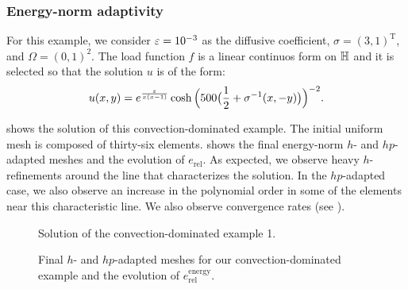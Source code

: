 \subsubsection{Energy-norm adaptivity}

For this example, we consider $\varepsilon= 10^{-3}$ as the diffusive coefficient, $\sigma=(3,1)^{\text{T}}$, and $\Omega=(0,1)^{2}$. The load function $f$ is a linear continuos form on $\mathbb{H}$ and it is selected so that the solution $u$ is of the form:
\begin{equation}
  u(x,y) = \displaystyle{e^{\frac{\varepsilon}{x (x - 1)} } \cosh \Big(500 \big(\frac{1}{2} + \sigma^{-1} (x, -y)\big) \Big)^{-2}.}
\end{equation}

 shows the solution of this convection-dominated  example. The initial uniform mesh is composed of thirty-six  elements.  shows the final energy-norm $h$- and $hp$-adapted meshes and the evolution of $e_{\textrm{rel}}$. As expected, we observe heavy $h$-refinements around the line that characterizes the solution. In the $hp$-adapted case, we also observe an increase in the polynomial order in some of the elements near this characteristic line. We also observe  convergence rates (see ).

\pagebreak

\begin{figure}
  \caption{Solution of the convection-dominated  example 1.}
  \label{fig:soltointBL}
\end{figure}

\pagebreak

\begin{figure}
  \caption{Final $h$- and $hp$-adapted meshes for our convection-dominated  example and the evolution of $e_{\textrm{rel}}^{\textrm{energy}}$.}
  \label{fig:intBL}
\end{figure}

